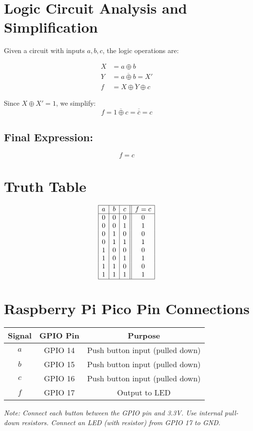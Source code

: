 \documentclass[12pt]{article}
\begin{document}
\Large

\section*{Logic Circuit Analysis and Simplification}

Given a circuit with inputs \(a, b, c\), the logic operations are:

\begin{align*}
X &= a \oplus b \\
Y &= \overline{a \oplus b} = X' \\
f &= \overline{X \oplus Y \oplus c}
\end{align*}

Since \(X \oplus X' = 1\), we simplify:
\[
f = \overline{1 \oplus c} = \overline{\overline{c}} = c
\]

\subsection*{Final Expression:}
\[
\boxed{f = c}
\]

\bigskip

\section*{Truth Table}

\[
\begin{array}{|c|c|c||c|}
\hline
a & b & c & f = c \\
\hline
0 & 0 & 0 & 0 \\
0 & 0 & 1 & 1 \\
0 & 1 & 0 & 0 \\
0 & 1 & 1 & 1 \\
1 & 0 & 0 & 0 \\
1 & 0 & 1 & 1 \\
1 & 1 & 0 & 0 \\
1 & 1 & 1 & 1 \\
\hline
\end{array}
\]

\bigskip

\section*{Raspberry Pi Pico Pin Connections}

\begin{tabular}{|c|c|c|}
\hline
\textbf{Signal} & \textbf{GPIO Pin} & \textbf{Purpose} \\
\hline
\(a\) & GPIO 14 & Push button input (pulled down) \\
\(b\) & GPIO 15 & Push button input (pulled down) \\
\(c\) & GPIO 16 & Push button input (pulled down) \\
\(f\) & GPIO 17 & Output to LED \\
\hline
\end{tabular}

\bigskip

\textit{Note: Connect each button between the GPIO pin and 3.3V. Use internal pull-down resistors. Connect an LED (with resistor) from GPIO 17 to GND.}
\end{document}
